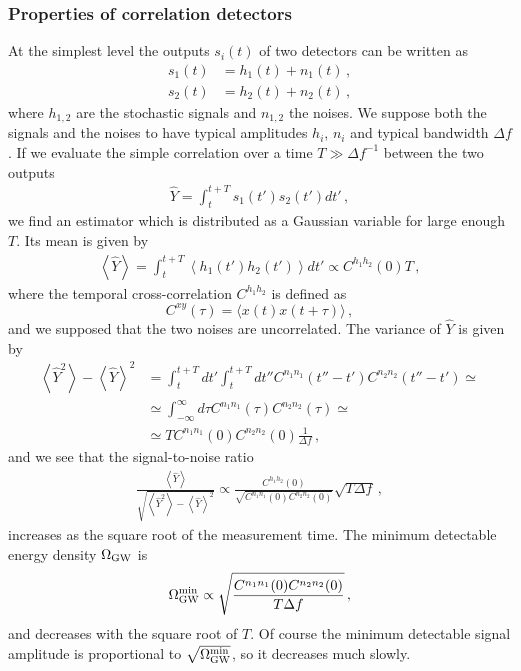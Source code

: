 \documentclass[11pt,a4paper]{article}
\begin{document}
\subsubsection{Properties of correlation detectors}

At the simplest level the outputs $s_i(t)$ of two detectors can be written as
\begin{align}
	s_1(t) &= h_1(t) + n_1(t) \,,\nonumber \\
	s_2(t) &= h_2(t)+  n_2(t) \,,
\end{align}
where $h_{1,2}$ are the stochastic signals and $n_{1,2}$ the noises. We suppose both the signals and the noises to have typical amplitudes $h_i$, $n_i$ and typical bandwidth $\Delta f$.
If we evaluate the simple correlation over a time $T\gg \Delta f^{-1}$ between the two outputs
\begin{align}
	\hat{Y} = \int_t^{t+T} s_1(t') s_2(t') dt' \,,
\end{align}
we find an estimator which is distributed as a Gaussian variable for large enough $T$. Its mean is given by
\begin{align}
	\left<\hat{Y}\right> = \int_t^{t+T} \left<h_1(t') h_2(t')\right> dt' \propto C^{h_1 h_2}(0) T \,,
\end{align}
where the temporal cross-correlation $C^{h_1 h_2}$ is defined as
\begin{equation}
C^{xy}(\tau) = \langle x(t) x(t+\tau) \rangle \,,
\end{equation}
and we supposed that the two noises are uncorrelated. The variance of $\hat Y$ is given by
\begin{align}
	\left<\hat{Y}^2\right>-\left<\hat{Y}\right>^2 & = \int_t^{t+T} dt' \int_t^{t+T} dt'' C^{n_1 n_1}(t'' - t') C^{n_2 n_2}(t''-t') \simeq \nonumber \\
	&\simeq \int_{-\infty}^{\infty} d\tau C^{n_1 n_1}(\tau) C^{n_2 n_2}(\tau) \simeq \nonumber \\
	&\simeq T C^{n_1 n_1}(0) C^{n_2 n_2}(0) \frac{1}{\Delta f} \,,
\end{align}
and we see that the signal-to-noise ratio
\begin{align}
	\frac{\left<\hat{Y}\right>}{\sqrt{\left<\hat{Y}^2\right>-\left<\hat{Y}\right>^2}} \propto \frac{C^{h_1 h_2}(0)}{\sqrt{C^{n_1 n_1}(0) C^{n_2 n_2}(0)}} \sqrt{T\Delta f} \,,
\end{align}
increases as the square root of the measurement time. The minimum detectable energy density $\Omega_{\rm GW}$ is
\begin{equation}
\Omega^{\rm min}_{\rm GW} \propto \sqrt{\frac{C^{n_1 n_1}(0) C^{n_2 n_2}(0)}{T \Delta f}} \,,
\end{equation}
 and decreases with the square root of $T$. Of course the minimum detectable signal amplitude is proportional to $\sqrt{\Omega^{\rm min}_{\rm GW}}$, so it decreases much slowly.
\end{document}
